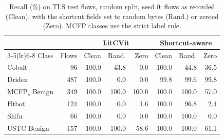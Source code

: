 \begin{table}[t]
\centering
\caption{Recall (\%) on TLS test flows, random split, seed 0: flows as recorded (Clean), with the shortcut fields set to random bytes (Rand.) or zeroed (Zero). MCFP classes use the strict label rule.}
\label{tab:litcvit-tls}
\setlength{\tabcolsep}{4pt}
\begin{tabular}{lrrrrrrr}
\toprule
 &  & \multicolumn{3}{c}{LitCVit} & \multicolumn{3}{c}{Shortcut-aware} \\
\cmidrule(lr){3-5}\cmidrule(lr){6-8}
Class & Flows & Clean & Rand. & Zero & Clean & Rand. & Zero \\
\midrule
Cobalt & 96 & 100.0 & 43.8 & 0.0 & 100.0 & 44.8 & 36.5 \\
Dridex & 487 & 100.0 & 0.0 & 0.0 & 99.8 & 99.6 & 99.8 \\
MCFP$_{s}$ Benign & 349 & 100.0 & 100.0 & 100.0 & 100.0 & 100.0 & 57.0 \\
Htbot & 124 & 100.0 & 0.0 & 1.6 & 100.0 & 96.8 & 2.4 \\
Shifu & 66 & 100.0 & 0.0 & 0.0 & 100.0 & 100.0 & 0.0 \\
USTC Benign & 157 & 100.0 & 100.0 & 58.6 & 100.0 & 100.0 & 61.1 \\
\bottomrule
\end{tabular}
\end{table}
